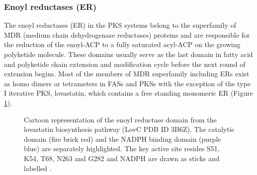 			\subsubsection{Enoyl reductases (ER)}
			\label{sec:ER}
			The enoyl reductases (ER) in the PKS systems belong to the superfamily of MDR (medium chain dehydrogenase reductases) proteins and are responsible for the reduction of the enoyl-ACP to a fully saturated acyl-ACP on the growing polyketide molecule. These domains usually serve as the last domain in fatty acid and polyketide chain extension and modification cycle before the next round of extension begins. Most of the members of MDR superfamily including ERs exist as homo dimers or tetrameters in FASs and PKSs with the exception of the type I iterative PKS, lovastatin, which contains a free standing monomeric ER (Figure \ref{fig:ER}). 

			\setlength\fboxsep{5pt}
 			\setlength\fboxrule{1.5pt}
			\begin{figure} []
			\centering
			\caption[Cartoon representation of the enoyl reductase domain from the lovastatin biosynthesis pathway]{Cartoon representation of the enoyl reductase domain from the lovastatin biosynthesis pathway (LovC PDB ID 3B6Z). The catalytic domain (fire brick red) and the NADPH binding domain (purple blue) are separately highlighted. The key active site  resides  S51, K54, T68, N263 and G282 and NADPH are drawn as sticks and labelled \parencite{Ames2012}. }
			\label{fig:ER}
			\end{figure}
						

